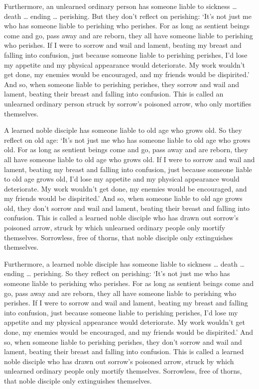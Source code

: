 \documentclass[12pt,openany]{book}%
\begin{document}
Furthermore, an unlearned ordinary person has someone liable to sickness … death … ending … perishing. But they don’t reflect on perishing: ‘It’s not just me who has someone liable to perishing who perishes. For as long as sentient beings come and go, pass away and are reborn, they all have someone liable to perishing who perishes. If I were to sorrow and wail and lament, beating my breast and falling into confusion, just because someone liable to perishing perishes, I’d lose my appetite and my physical appearance would deteriorate. My work wouldn’t get done, my enemies would be encouraged, and my friends would be dispirited.’ And so, when someone liable to perishing perishes, they sorrow and wail and lament, beating their breast and falling into confusion. This is called an unlearned ordinary person struck by sorrow’s poisoned arrow, who only mortifies themselves. 

A learned noble disciple has someone liable to old age who grows old. So they reflect on old age: ‘It’s not just me who has someone liable to old age who grows old. For as long as sentient beings come and go, pass away and are reborn, they all have someone liable to old age who grows old. If I were to sorrow and wail and lament, beating my breast and falling into confusion, just because someone liable to old age grows old, I’d lose my appetite and my physical appearance would deteriorate. My work wouldn’t get done, my enemies would be encouraged, and my friends would be dispirited.’ And so, when someone liable to old age grows old, they don’t sorrow and wail and lament, beating their breast and falling into confusion. This is called a learned noble disciple who has drawn out sorrow’s poisoned arrow, struck by which unlearned ordinary people only mortify themselves. Sorrowless, free of thorns, that noble disciple only extinguishes themselves. 

Furthermore, a learned noble disciple has someone liable to sickness … death … ending … perishing. So they reflect on perishing: ‘It’s not just me who has someone liable to perishing who perishes. For as long as sentient beings come and go, pass away and are reborn, they all have someone liable to perishing who perishes. If I were to sorrow and wail and lament, beating my breast and falling into confusion, just because someone liable to perishing perishes, I’d lose my appetite and my physical appearance would deteriorate. My work wouldn’t get done, my enemies would be encouraged, and my friends would be dispirited.’ And so, when someone liable to perishing perishes, they don’t sorrow and wail and lament, beating their breast and falling into confusion. This is called a learned noble disciple who has drawn out sorrow’s poisoned arrow, struck by which unlearned ordinary people only mortify themselves. Sorrowless, free of thorns, that noble disciple only extinguishes themselves. 
\end{document}
